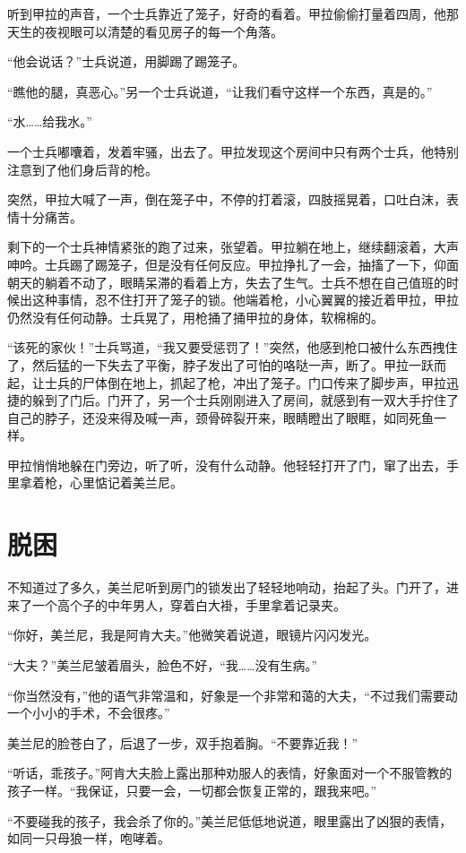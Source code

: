 听到甲拉的声音，一个士兵靠近了笼子，好奇的看着。甲拉偷偷打量着四周，他那天生的夜视眼可以清楚的看见房子的每一个角落。

“他会说话？”士兵说道，用脚踢了踢笼子。

“瞧他的腿，真恶心。”另一个士兵说道，“让我们看守这样一个东西，真是的。”

“水……给我水。”

一个士兵嘟囔着，发着牢骚，出去了。甲拉发现这个房间中只有两个士兵，他特别注意到了他们身后背的枪。

突然，甲拉大喊了一声，倒在笼子中，不停的打着滚，四肢摇晃着，口吐白沫，表情十分痛苦。

剩下的一个士兵神情紧张的跑了过来，张望着。甲拉躺在地上，继续翻滚着，大声呻吟。士兵踢了踢笼子，但是没有任何反应。甲拉挣扎了一会，抽搐了一下，仰面朝天的躺着不动了，眼睛呆滞的看着上方，失去了生气。士兵不想在自己值班的时候出这种事情，忍不住打开了笼子的锁。他端着枪，小心翼翼的接近着甲拉，甲拉仍然没有任何动静。士兵晃了，用枪捅了捅甲拉的身体，软棉棉的。

“该死的家伙！”士兵骂道，“我又要受惩罚了！”突然，他感到枪口被什么东西拽住了，然后猛的一下失去了平衡，脖子发出了可怕的咯哒一声，断了。甲拉一跃而起，让士兵的尸体倒在地上，抓起了枪，冲出了笼子。门口传来了脚步声，甲拉迅捷的躲到了门后。门开了，另一个士兵刚刚进入了房间，就感到有一双大手拧住了自己的脖子，还没来得及喊一声，颈骨碎裂开来，眼睛瞪出了眼眶，如同死鱼一样。

甲拉悄悄地躲在门旁边，听了听，没有什么动静。他轻轻打开了门，窜了出去，手里拿着枪，心里惦记着美兰尼。

\chapter{脱困}

不知道过了多久，美兰尼听到房门的锁发出了轻轻地响动，抬起了头。门开了，进来了一个高个子的中年男人，穿着白大褂，手里拿着记录夹。

“你好，美兰尼，我是阿肯大夫。”他微笑着说道，眼镜片闪闪发光。

“大夫？”美兰尼皱着眉头，脸色不好，“我……没有生病。”

“你当然没有，”他的语气非常温和，好象是一个非常和蔼的大夫，“不过我们需要动一个小小的手术，不会很疼。”

美兰尼的脸苍白了，后退了一步，双手抱着胸。“不要靠近我！”

“听话，乖孩子。”阿肯大夫脸上露出那种劝服人的表情，好象面对一个不服管教的孩子一样。“我保证，只要一会，一切都会恢复正常的，跟我来吧。”

“不要碰我的孩子，我会杀了你的。”美兰尼低低地说道，眼里露出了凶狠的表情，如同一只母狼一样，咆哮着。

